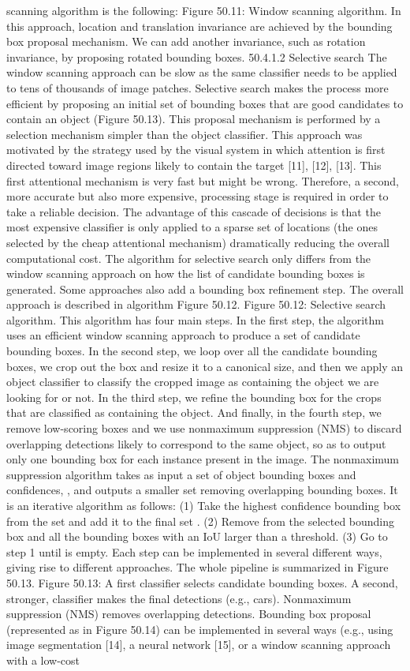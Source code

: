 scanning algorithm is the following: Figure 50.11: Window scanning algorithm. In this approach, location and translation invariance are achieved by the bounding box proposal mechanism. We can add another invariance, such as rotation invariance, by proposing rotated bounding boxes. 50.4.1.2 Selective search The window scanning approach can be slow as the same classifier needs to be applied to tens of thousands of image patches. Selective search makes the process more efficient by proposing an initial set of bounding boxes that are good candidates to contain an object (Figure 50.13). This proposal mechanism is performed by a selection mechanism simpler than the object classifier. This approach was motivated by the strategy used by the visual system in which attention is first directed toward image regions likely to contain the target [11], [12], [13]. This first attentional mechanism is very fast but might be wrong. Therefore, a second, more accurate but also more expensive, processing stage is required in order to take a reliable decision. The advantage of this cascade of decisions is that the most expensive classifier is only applied to a sparse set of locations (the ones selected by the cheap attentional mechanism) dramatically reducing the overall computational cost. The algorithm for selective search only differs from the window scanning approach on how the list of candidate bounding boxes is generated. Some approaches also add a bounding box refinement step. The overall approach is described in algorithm Figure 50.12. Figure 50.12: Selective search algorithm. This algorithm has four main steps. In the first step, the algorithm uses an efficient window scanning approach to produce a set of candidate bounding boxes. In the second step, we loop over all the candidate bounding boxes, we crop out the box and resize it to a canonical size, and then we apply an object classifier to classify the cropped image as containing the object we are looking for or not. In the third step, we refine the bounding box for the crops that are classified as containing the object. And finally, in the fourth step, we remove low-scoring boxes and we use nonmaximum suppression (NMS) to discard overlapping detections likely to correspond to the same object, so as to output only one bounding box for each instance present in the image. The nonmaximum suppression algorithm takes as input a set of object bounding boxes and confidences, , and outputs a smaller set removing overlapping bounding boxes. It is an iterative algorithm as follows: (1) Take the highest confidence bounding box from the set and add it to the final set . (2) Remove from the selected bounding box and all the bounding boxes with an IoU larger than a threshold. (3) Go to step 1 until is empty. Each step can be implemented in several different ways, giving rise to different approaches. The whole pipeline is summarized in Figure 50.13. Figure 50.13: A first classifier selects candidate bounding boxes. A second, stronger, classifier makes the final detections (e.g., cars). Nonmaximum suppression (NMS) removes overlapping detections. Bounding box proposal (represented as in Figure 50.14) can be implemented in several ways (e.g., using image segmentation [14], a neural network [15], or a window scanning approach with a low-cost 